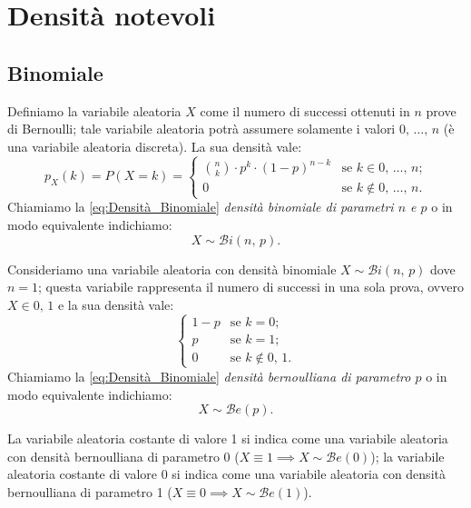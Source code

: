     \section{Densità notevoli}
        \subsection{Binomiale}
            \begin{defn}\label{defn:Densità_Binomiale}
                Definiamo la variabile aleatoria $X$ come il numero di successi ottenuti in $n$ prove di Bernoulli; tale variabile aleatoria potrà assumere solamente i valori $0,\, \ldots,\, n$ (è una variabile aleatoria discreta).
                La sua densità vale:
                \begin{equation}\label{eq:Densità_Binomiale}
                    p_X(k) = P(X = k) = \begin{cases}
                        \binom{n}{k}\cdot p^k\cdot (1-p)^{n-k} & \text{se $k \in {0,\, \ldots,\, n}$;}\\
                        0 & \text{se $k \notin {0,\, \ldots,\, n}$.}
                    \end{cases}
                \end{equation}
                Chiamiamo la \eqref{eq:Densità_Binomiale} \emph{densità binomiale di parametri $n$ e $p$} o in modo equivalente indichiamo: \[
                    X \sim \mathcal{B}i(n,\,p)
                .\]
            \end{defn}
            \begin{defn}\label{defn:Densità_Bernoulliana}
                Consideriamo una variabile aleatoria con densità binomiale $X \sim \mathcal{B}i(n,\,p)$ dove $n = 1$; questa variabile rappresenta il numero di successi in una sola prova, ovvero $X \in {0,\, 1}$ e la sua densità vale:
                \begin{equation}\label{eq:Densità_Bernoulliana}
                    \begin{cases}
                        1-p & \text{se $k=0$;} \\
                        p & \text{se $k=1$;} \\
                        0 & \text{se $k \notin {0,\, 1}$.}
                    \end{cases}
                \end{equation}
                Chiamiamo la \eqref{eq:Densità_Binomiale} \emph{densità bernoulliana di parametro $p$} o in modo equivalente indichiamo: \[
                    X \sim \mathcal{B}e(p)
                .\] 
            \end{defn}
            \begin{obsv}
                La variabile aleatoria costante di valore 1 si indica come una variabile aleatoria con densità bernoulliana di parametro 0 ($X \equiv 1 \implies X \sim \mathcal{B}e(0)$); la variabile aleatoria costante di valore 0 si indica come una variabile aleatoria con densità bernoulliana di parametro 1 ($X \equiv 0 \implies X \sim \mathcal{B}e(1)$).
            \end{obsv}
